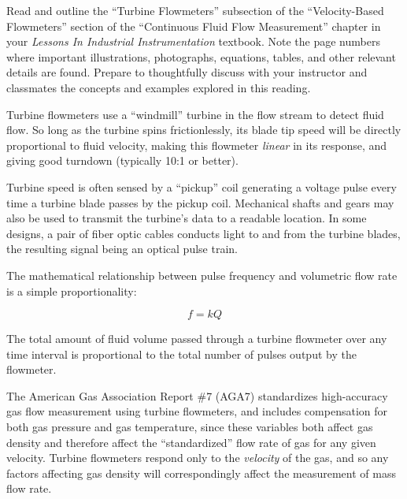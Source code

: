

Read and outline the ``Turbine Flowmeters'' subsection of the ``Velocity-Based Flowmeters'' section of the ``Continuous Fluid Flow Measurement'' chapter in your {\it Lessons In Industrial Instrumentation} textbook.  Note the page numbers where important illustrations, photographs, equations, tables, and other relevant details are found.  Prepare to thoughtfully discuss with your instructor and classmates the concepts and examples explored in this reading.














Turbine flowmeters use a ``windmill'' turbine in the flow stream to detect fluid flow.  So long as the turbine spins frictionlessly, its blade tip speed will be directly proportional to fluid velocity, making this flowmeter {\it linear} in its response, and giving good turndown (typically 10:1 or better).

\vskip 10pt

Turbine speed is often sensed by a ``pickup'' coil generating a voltage pulse every time a turbine blade passes by the pickup coil.  Mechanical shafts and gears may also be used to transmit the turbine's data to a readable location.  In some designs, a pair of fiber optic cables conducts light to and from the turbine blades, the resulting signal being an optical pulse train.

\vskip 10pt

The mathematical relationship between pulse frequency and volumetric flow rate is a simple proportionality:

$$f = kQ$$

The total amount of fluid volume passed through a turbine flowmeter over any time interval is proportional to the total number of pulses output by the flowmeter.

\vskip 10pt

The American Gas Association Report \#7 (AGA7) standardizes high-accuracy gas flow measurement using turbine flowmeters, and includes compensation for both gas pressure and gas temperature, since these variables both affect gas density and therefore affect the ``standardized'' flow rate of gas for any given velocity.  Turbine flowmeters respond only to the {\it velocity} of the gas, and so any factors affecting gas density will correspondingly affect the measurement of mass flow rate.

